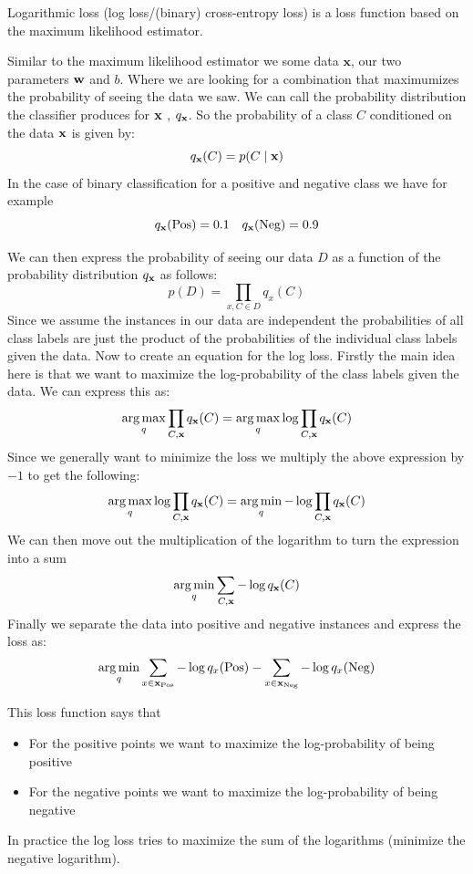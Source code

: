 \documentclass[12pt]{article}
\begin{document}
\begin{definition}
    Logarithmic loss (log loss/(binary) cross-entropy loss) is a loss function based on the maximum likelihood estimator.  
\end{definition}

Similar to the maximum likelihood estimator we some data $\mathbf x$, our two parameters $\mathbf{w}$ and $b$. Where we are looking for a combination that maximumizes the probability of seeing the data we saw. We can call the probability distribution the classifier produces for $\mathbf{x}$ , $q_{\mathbf{x}}$. So the probability of a class $C$ conditioned on the data $\mathbf{x}$ is given by:
\[
    q_{\mathbf{x}}(C) = p(C\mid \mathbf{x})  
\]
In the case of binary classification for a positive and negative class we have for example 
\[
    q_{\mathbf{x}}(\text{Pos}) = 0.1 \quad q_{\mathbf{x}}(\text{Neg}) = 0.9  
\]

We can then express the probability of seeing our data $D$ as a function of the probability distribution $q_{\mathbf{x}}$ as follows:
\[
    p(D) = \prod_{x, C\in D} q_x(C)  
\]
Since we assume the instances in our data are independent the probabilities of all class labels are just the product of the probabilities of the individual class labels given the data. Now to create an equation for the log loss. Firstly the main idea here is that we want to maximize the log-probability of the class labels given the data. We can express this as: 
\[
    \operatorname*{arg\, max}_q \prod_{C, \mathbf{x}} q_{\mathbf{x}} (C) = \operatorname*{arg\, max}_q \log \prod_{C, \mathbf{x}} q_{\mathbf{x}} (C)  
\]
Since we generally want to minimize the loss we multiply the above expression by $-1$ to get the following: 
\[
    \operatorname*{arg\, max}_q \log \prod_{C, \mathbf{x}} q_{\mathbf{x}} (C) = \operatorname*{arg\, min}_q -\log \prod_{C, \mathbf{x}} q_{\mathbf{x}} (C) 
\]
We can then move out the multiplication of the logarithm to turn the expression into a sum 
\[
    \operatorname*{arg\, min}_q \sum_{C, \mathbf{x}} -\log q_{\mathbf{x}} (C)
\]
Finally we separate the data into positive and negative instances and express the loss as:
\[
    \operatorname*{arg\, min}_q \sum_{x\in \mathbf{x} _\text{Pos}} -\log q_x (\text{Pos}) - \sum_{x\in\mathbf{x}_\text{Neg}} -\log q_x (\text{Neg})  
\]

This loss function says that 
\begin{itemize}[leftmargin=*, noitemsep]
    \item For the positive points we want to maximize the log-probability of being positive
    \item For the negative points we want to maximize the log-probability of being negative 
\end{itemize}
\newpage
In practice the log loss tries to maximize the sum of the logarithms (minimize the negative logarithm).
\end{document}
